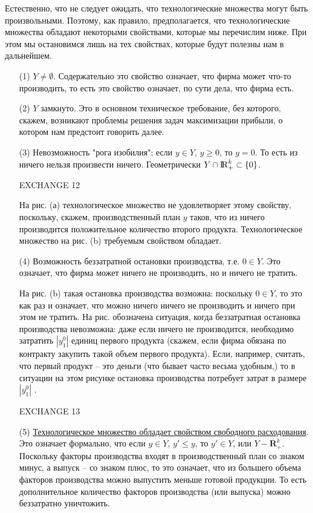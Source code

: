 Естественно, что не следует ожидать, что технологические множества
могут быть произвольными. Поэтому, как правило, предполагается,
что технологические множества обладают некоторыми свойствами,
которые мы перечислим ниже. При этом мы остановимся лишь на тех свойствах,
которые будут полезны нам в дальнейшем.
\begin{itemize}
\item[(1)] $Y\ne \emptyset$. Содержательно это свойство означает,
что фирма может что-то производить, то есть это свойство означает,
по сути дела, что фирма есть.
\item[(2)] $Y$ замкнуто. Это в основном техническое требование, без
которого, скажем, возникают проблемы решения задач максимизации
прибыли, о котором нам предстоит говорить далее.
\item[(3)] Невозможность "рога изобилия": если  $y\in Y$, $y\ge 0$, то $y=0$.
То есть из ничего нельзя произвести ничего.  Геометрически
$Y\cap{\rm I\!R}^k_+\subset\{0\}$.

EXCHANGE 12

На рис.   (а) технологическое множество не удовлетворяет этому свойству,
поскольку, скажем, производственный план $y$ таков, что из ничего
производится положительное количество второго продукта. Технологическое
множество на рис.   (b) требуемым свойством обладает.

\item[(4)] Возможность беззатратной остановки производства, т.е. $0\in Y$.
Это означает, что фирма может ничего не производить, но и ничего
не тратить.

На рис.  (b) такая остановка производства возможна: поскольку $0\in Y$, то
это как раз и означает, что можно ничего ничего не производить и
ничего при этом не тратить.
На рис.   обозначена ситуация, когда беззатратная остановка производства
невозможна: даже если ничего не производится, необходимо затратить
$|y^0_1|$ единиц первого продукта (скажем, если фирма обязана
по контракту закупить такой объем первого продукта). Если, например,
считать, что первый продукт --
это деньги (что бывает часто весьма удобным,) то в ситуации на этом рисунке
остановка производства потребует затрат в размере $|y^0_1|$ .

EXCHANGE 13

\item[(5)] \underline{Технологическое множество обладает свойством свободного
расходования}. Это означает формально, что если $y\in Y$, $y'\le
y$, то $y'\in Y$, или $Y-\textbf{R}^k_+$. Поскольку факторы производства входят
в производственный
план со знаком минус, а выпуск -- со знаком плюс, то это означает, что из большего
объема факторов производства можно выпустить меньше готовой
продукции. То есть дополнительное количество факторов производства
(или выпуска) можно беззатратно уничтожить.


\end{itemize}
